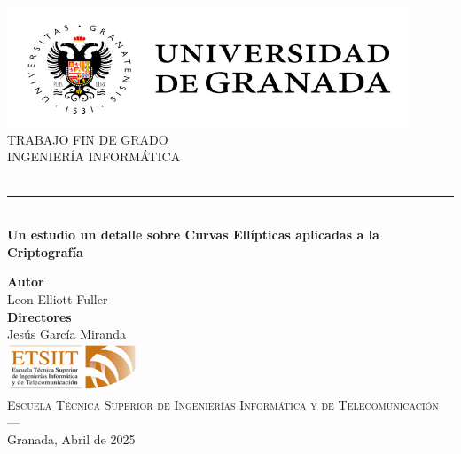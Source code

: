 \begin{titlepage}
 
 
    \newlength{\centeroffset}
    \setlength{\centeroffset}{-0.5\oddsidemargin}
    \addtolength{\centeroffset}{0.5\evensidemargin}
    \thispagestyle{empty}
    
    \noindent\hspace*{\centeroffset}\begin{minipage}{\textwidth}
    
    \centering
    \includegraphics[width=0.9\textwidth]{imagenes/logo_ugr.jpg}\\[1.4cm]
    
    \textsc{ \Large TRABAJO FIN DE GRADO\\[0.2cm]}
    \textsc{ INGENIERÍA INFORMÁTICA}\\[1cm]
    {\Huge\bfseries {\myTitle}\\
    }
    \noindent\rule[-1ex]{\textwidth}{3pt}\\[3.5ex]
    {\large\bfseries Un estudio un detalle sobre Curvas Ellípticas aplicadas a la Criptografía}
    \end{minipage}
    
    \vspace{2.5cm}
    \noindent\hspace*{\centeroffset}\begin{minipage}{\textwidth}
    \centering
    
    \textbf{Autor}\\ {Leon Elliott Fuller}\\[2.5ex]
    \textbf{Directores}\\
    {Jesús García Miranda\\[2cm]}
    \includegraphics[width=0.3\textwidth]{imagenes/etsiit_logo.png}\\[0.1cm]
    \textsc{Escuela Técnica Superior de Ingenierías Informática y de Telecomunicación}\\
    \textsc{---}\\
    Granada, Abril de 2025
    \end{minipage}
    \end{titlepage}
    
    
    